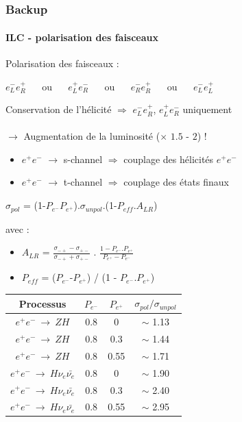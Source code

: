 \documentclass[8pt]{beamer}
\begin{document}
\appendix


  \section{}
  \newcommand{\backup}{Backup}

  \begin{frame}
  \frametitle{\backup}
  \framesubtitle{ILC - polarisation des faisceaux}

  Polarisation des faisceaux : \\
  \begin{center} $e^{-}_{L}e^{+}_{R}$ ~~ ou ~~ $e^{+}_{L}e^{-}_{R}$ ~~ ou ~~ $e^{-}_{R}e^{+}_{R}$ ~~ ou ~~ $e^{-}_{L}e^{+}_{L}$ \end{center}
  Conservation de l'hélicité $\Rightarrow$ $e^{-}_{L}e^{+}_{R}$, $e^{+}_{L}e^{-}_{R}$ uniquement \\
  ~ \\
  $\rightarrow$ Augmentation de la luminosité ($\times$ $1.5$ - $2$) ! \\
  \begin{itemize}
    \item $e^+e^-$ $\rightarrow$ s-channel $\Rightarrow$ couplage des hélicités $e^+e^-$
    \item $e^+e^-$ $\rightarrow$ t-channel $\Rightarrow$ couplage des états finaux
  \end{itemize}
  \begin{center} $\sigma_{pol}$ = (1-$P_{e^-}P_{e^+}$).$\sigma_{unpol}$.(1-$P_{eff}.A_{LR}$) \end{center}
  avec :
  \begin{itemize}
    \item $A_{LR}$ = $\frac{\sigma_{-+}-\sigma_{+-}}{\sigma_{-+}+\sigma_{+-}}$ . $\frac{1 - P_{e^-}.P_{e^+}}{P_{e^+}-P_{e^-}}$
    \item $P_{eff}$ = ($P_{e^-}$-$P_{e^+}$) / (1 - $P_{e^-}$.$P_{e^+}$)
  \end{itemize}
  \begin{center}
    \begin{tabular}{c|c|c|c}
      Processus & $P_{e^-}$ & $P_{e^+}$ & $\sigma_{pol}/\sigma_{unpol}$ \\ \hline
      $e^+e^-~\rightarrow~ZH$ & 0.8 & 0    & $\sim$ 1.13 \\
      $e^+e^-~\rightarrow~ZH$ & 0.8 & 0.3  & $\sim$ 1.44 \\
      $e^+e^-~\rightarrow~ZH$ & 0.8 & 0.55 & $\sim$ 1.71 \\ \hline
      $e^+e^-~\rightarrow~H\nu_e \bar{\nu_e}$ & 0.8 & 0    & $\sim$ 1.90 \\
      $e^+e^-~\rightarrow~H\nu_e \bar{\nu_e}$ & 0.8 & 0.3  & $\sim$ 2.40 \\
      $e^+e^-~\rightarrow~H\nu_e \bar{\nu_e}$ & 0.8 & 0.55 & $\sim$ 2.95 \\ \hline
    \end{tabular}
  \end{center}
  \end{frame}
\end{document}
